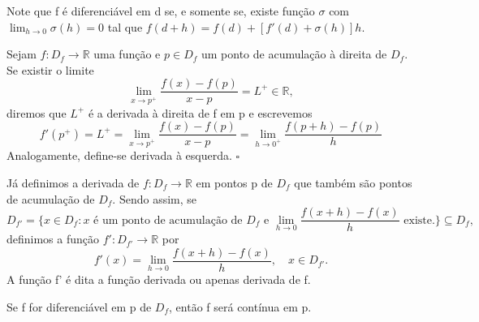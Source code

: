 \documentclass[Analysis/analysis_notes.tex]{subfiles}
\begin{document}
Note que f é diferenciável em d se, e somente se, existe fun\c cão \(\sigma \)
com \(\lim_{h\to 0}\sigma (h)=0\) tal que \(f(d+h)=f(d)+[f'(d)+\sigma (h)]h\).
\begin{def*}
	Sejam \(f:D_{f}\rightarrow \mathbb{R}\) uma fun\c cão e \(p\in D_{f}\) um ponto
	de acumula\c cão à direita de \(D_{f}\). Se existir o limite
	\[
		\lim_{x\to p^{+}}\frac{f(x)-f(p)}{x-p}=L^+\in \mathbb{R},
	\]
	diremos que \(L^+\) é a derivada à direita de f em p e escrevemos
	\[
		f'(p^+) = L^+=\lim_{x\to p^+}\frac{f(x)-f(p)}{x-p}= \lim_{h\to 0^{+}}\frac{f(p+h)-f(p)}{h}
	\]
	Analogamente, define-se derivada à esquerda. \(\square\)
\end{def*}
Já definimos a derivada de \(f:D_{f}\rightarrow \mathbb{R}\) em pontos p de
\(D_{f}\) que também são pontos de acumula\c cão de \(D_{f}\). Sendo assim,
se
\[
	D_{f'}= \biggl\{x\in D_{f}:x\text{ é um ponto de acumula\c cão de $D_{f}$ e }\lim_{h\to 0}\frac{f(x+h)-f(x)}{h}\text{ existe.}\biggr\}\subseteq{D_{f}},
\]
definimos a fun\c cão \(f':D_{f'}\rightarrow \mathbb{R}\) por
\[
	f'(x) = \lim_{h\to 0}\frac{f(x+h)-f(x)}{h}, \quad x\in D_{f'}.
\]
A fun\c cão f' é dita a fun\c cão derivada ou apenas derivada de f.
\hypertarget{diff_cont}{
	\begin{theorem*}
		Se f for diferenciável em p de \(D_{f}\), então f será contínua em p.
	\end{theorem*}
}
\end{document}
